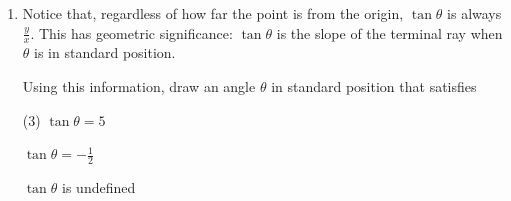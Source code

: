 \documentclass[main]{subfiles}
\begin{document}
\begin{enumerate}
\item Notice that, regardless of how far the point is from the origin, $\tan \theta$ is always $\frac{y}{x}$. This has geometric significance: $\tan \theta$ is the slope of the terminal ray when $\theta$ is in standard position.

Using this information, draw an angle $\theta$ in standard position that satisfies
\begin{tasks}(3)
\task $\tan \theta = 5$

\begin{solution}

    \begin{tikzangle}[angle=rad(atan(5))]
    \end{tikzangle}
\end{solution}
\task $\tan \theta = -\frac{1}{2}$

\begin{solution}

    \begin{tikzangle}[angle=rad(atan(-1/2))]
    \end{tikzangle}
\end{solution}
\task $\tan \theta$ is undefined

\begin{solution}

    \begin{tikzangle}[angle=pi/2]
    \end{tikzangle}
\end{solution}
\end{tasks}

\end{enumerate}
\newpage
\end{document}
